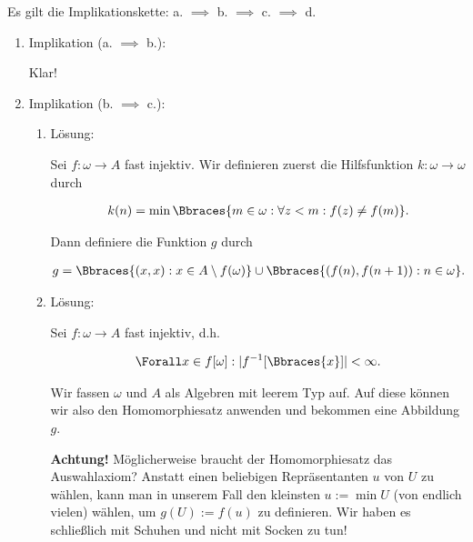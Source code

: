 \begin{solution}

Es gilt die Implikationskette: a. $\implies$ b. $\implies$ c. $\implies$ d.

\begin{enumerate}[label = \arabic*.]

  \item Implikation (a. $\implies$ b.):
  
  Klar!

  \item Implikation (b. $\implies$ c.):
  
  \begin{enumerate}[label = \arabic*.]

    \item Lösung:

    Sei $f: \omega \to A$ fast injektiv.
    Wir definieren zuerst die Hilfsfunktion $k: \omega \to \omega$ durch
  
    \begin{align*}
      k(n) = \min \Bbraces{m \in \omega: \forall z < m: f(z) \neq f(m)}.
    \end{align*}
  
    Dann definiere die Funktion $g$ durch
  
    \begin{align*}
      g = \Bbraces{(x, x): x \in A \setminus f(\omega)} \cup \Bbraces{(f(n), f(n+1)): n \in \omega}.
    \end{align*}

    \item Lösung:
    
    Sei $f: \omega \to A$ fast injektiv, d.h.

    \begin{align*}
      \Forall x \in f[\omega]:
      |f^{-1}[\Bbraces{x}]| < \infty.
    \end{align*}

    Wir fassen $\omega$ und $A$ als Algebren mit leerem Typ auf.
    Auf diese können wir also den Homomorphiesatz anwenden und bekommen eine Abbildung $g$.

    \textbf{Achtung!}
    Möglicherweise braucht der Homomorphiesatz das Auswahlaxiom?
    Anstatt einen beliebigen Repräsentanten $u$ von $U$ zu wählen, kann man in unserem Fall den kleinsten $u := \min U$ (von endlich vielen) wählen, um $g(U) := f(u)$ zu definieren.
    Wir haben es schließlich mit Schuhen und nicht mit Socken zu tun!

    \phantom{}


\end{enumerate}
\end{enumerate}
\end{solution}
